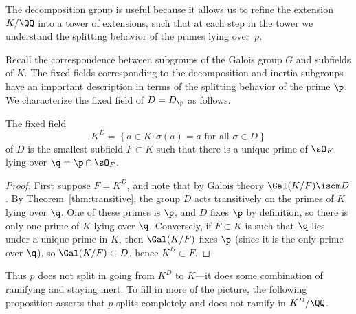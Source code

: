 The decomposition group is useful because it allows us
to refine the extension $K/\QQ$ into a tower of extensions, such that at
each step in the tower we understand the splitting behavior
of the primes lying over~$p$.

Recall the correspondence between subgroups of the Galois group
$G$ and subfields of $K$. The fixed fields corresponding to the
decomposition and inertia subgroups have an important description
in terms of the splitting behavior of the prime $\p$.
We characterize the fixed field of $D=D_\p$ as follows.

\begin{proposition}\label{prop:nosplit}
  The fixed field
  \[
    K^D = \left\{a \in K \colon \sigma(a) = a\text{ for all }\sigma \in D\right\}
  \]
  of $D$ is the smallest subfield $F \subset K$ such that
  there is a unique prime of $\sO_K$ lying over $\q = \p\cap\sO_F$.
\end{proposition}
\begin{proof}
  First suppose $F = K^D$, and note that by Galois theory
  $\Gal(K/F)\isom D$. By Theorem~\ref{thm:transitive}, the group $D$
  acts transitively on the primes of $K$ lying over $\q$.  One of
  these primes is $\p$, and $D$ fixes $\p$ by definition, so there is
  only one prime of $K$ lying over $\q$.
  Conversely, if $F\subset K$ is such that $\q$ lies under a unique prime
  in $K$, then $\Gal(K/F)$ fixes $\p$ (since it is the only
  prime over $\q$), so $\Gal(K/F) \subset D$, hence $K^D \subset F$.
\end{proof}

Thus $p$ does not split in going from $K^D$ to $K$---it does some
combination of ramifying and staying inert.
To fill in more of the picture, the following proposition asserts that $p$
splits completely and does not ramify in $K^D/\QQ$.

